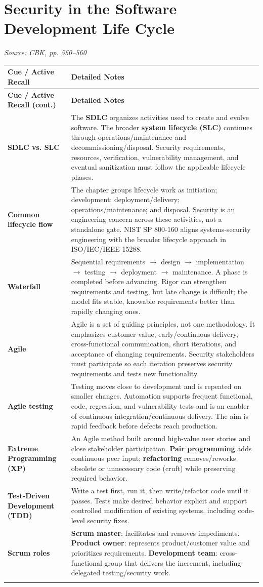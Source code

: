 \documentclass[10pt,letterpaper]{article}
\makeatletter
\newenvironment{cornell}{\rowcolors{2}{white}{notebg}\begin{longtable}{@{}>{\raggedright\arraybackslash\columncolor{cuebg}\color{navy}\bfseries}p{0.285\textwidth}>{\raggedright\arraybackslash}p{0.65\textwidth}@{}}\rowcolor{navy}\color{white}\textbf{Cue / Active Recall} & \color{white}\textbf{Detailed Notes}\\ \hline\endfirsthead\rowcolor{navy}\color{white}\textbf{Cue / Active Recall (cont.)} & \color{white}\textbf{Detailed Notes}\\ \hline\endhead}{\end{longtable}}
\newcommand{\noterow}[2]{#1 & #2\\\arrayrulecolor{line}\hline}\newcommand{\source}[1]{\par{\footnotesize\color{teal}\textit{Source: CBK, #1}}\par}
\makeatother
\begin{document}
\section{\color{navy}Security in the Software Development Life Cycle}
\source{pp. 550--560}
\begin{cornell}
\noterow{SDLC vs. SLC}{The \textbf{SDLC} organizes activities used to create and evolve software. The broader \textbf{system lifecycle (SLC)} continues through operations/maintenance and decommissioning/disposal. Security requirements, resources, verification, vulnerability management, and eventual sanitization must follow the applicable lifecycle phases.}
\noterow{Common lifecycle flow}{The chapter groups lifecycle work as initiation; development; deployment/delivery; operations/maintenance; and disposal. Security is an engineering concern across these activities, not a standalone gate. NIST SP 800-160 aligns systems-security engineering with the broader lifecycle approach in ISO/IEC/IEEE 15288.}
\noterow{Waterfall}{Sequential requirements $\rightarrow$ design $\rightarrow$ implementation $\rightarrow$ testing $\rightarrow$ deployment $\rightarrow$ maintenance. A phase is completed before advancing. Rigor can strengthen requirements and testing, but late change is difficult; the model fits stable, knowable requirements better than rapidly changing ones.}
\noterow{Agile}{Agile is a set of guiding principles, not one methodology. It emphasizes customer value, early/continuous delivery, cross-functional communication, short iterations, and acceptance of changing requirements. Security stakeholders must participate so each iteration preserves security requirements and tests new functionality.}
\noterow{Agile testing}{Testing moves close to development and is repeated on smaller changes. Automation supports frequent functional, code, regression, and vulnerability tests and is an enabler of continuous integration/continuous delivery. The aim is rapid feedback before defects reach production.}
\noterow{Extreme Programming (XP)}{An Agile method built around high-value user stories and close stakeholder participation. \textbf{Pair programming} adds continuous peer input; \textbf{refactoring} removes/reworks obsolete or unnecessary code (cruft) while preserving required behavior.}
\noterow{Test-Driven Development (TDD)}{Write a test first, run it, then write/refactor code until it passes. Tests make desired behavior explicit and support controlled modification of existing systems, including code-level security fixes.}
\noterow{Scrum roles}{\textbf{Scrum master}: facilitates and removes impediments. \textbf{Product owner}: represents product/customer value and prioritizes requirements. \textbf{Development team}: cross-functional group that delivers the increment, including delegated testing/security work.}

\end{cornell}
\end{document}
